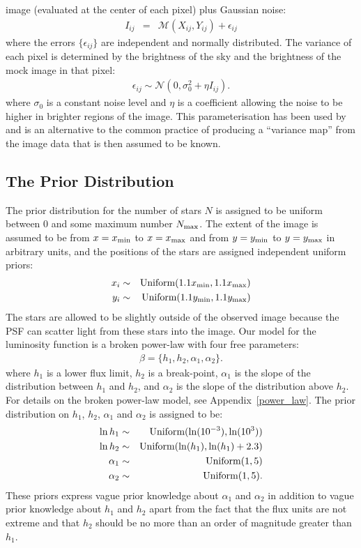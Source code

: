 \documentclass[manuscript]{aastex}
\begin{document}
image (evaluated at the center of each pixel) plus Gaussian noise:
\begin{eqnarray}
I_{ij} &=& \mathcal{M}(X_{ij}, Y_{ij}) + \epsilon_{ij}
\end{eqnarray}
where the errors $\{\epsilon_{ij}\}$ are independent and normally distributed.
The variance of each pixel is determined by the brightness of the sky and the
brightness of the mock image in that pixel:
\begin{eqnarray}
\epsilon_{ij} \sim \mathcal{N}(0, \sigma_0^2 + \eta I_{ij}).
\end{eqnarray}
where $\sigma_0$ is a constant noise level and $\eta$ is a coefficient allowing
the noise to be higher in brighter regions of the image.
This parameterisation has been used by \citet{2011MNRAS.412.2521B} and is an
alternative to the common practice of producing a ``variance map'' from the
image data that is then assumed to be known.

\subsection{The Prior Distribution}
The prior distribution for the number of stars $N$ is assigned to be uniform
between 0 and some maximum number $N_{\rm max}$. The extent of the image is
assumed to be from $x=x_{\rm min}$ to $x=x_{\rm max}$ and from
$y=y_{\rm min}$ to $y=y_{\rm max}$ in arbitrary units, and the
positions of the stars are assigned independent uniform priors:
\begin{eqnarray}
x_i &\sim& \textnormal{Uniform}(1.1 x_{\rm min}, 1.1 x_{\rm max}) \\
y_i &\sim& \textnormal{Uniform}(1.1 y_{\rm min}, 1.1 y_{\rm max})
\end{eqnarray}
The stars are allowed to be slightly outside of the observed image because the
PSF can scatter light from these stars into the image. Our model for the
luminosity function is a broken power-law with four
free parameters:
\begin{eqnarray}
\beta = \{h_1, h_2, \alpha_1, \alpha_2\}.
\end{eqnarray}
where $h_1$ is a lower flux limit, $h_2$ is a break-point, $\alpha_1$ is
the slope of the distribution between $h_1$ and $h_2$, and $\alpha_2$ is the
slope of the distribution above $h_2$. For details on the broken power-law
model, see Appendix~\ref{power_law}. The prior distribution on $h_1$, $h_2$,
$\alpha_1$ and $\alpha_2$ is assigned to be:
\begin{eqnarray}
\ln h_1 &\sim& \textnormal{Uniform}(\ln(10^{-3}), \ln(10^3)) \\
\ln h_2 &\sim& \textnormal{Uniform}(\ln(h_1), \ln(h_1) + 2.3) \\
\alpha_1 &\sim& \textnormal{Uniform}(1, 5) \\
\alpha_2 &\sim& \textnormal{Uniform}(1, 5).
\end{eqnarray}
These priors express vague prior knowledge about $\alpha_1$ and $\alpha_2$ in
addition to vague prior knowledge about $h_1$ and $h_2$ apart from the fact
that the flux units are not extreme and that $h_2$ should be no more than an
order of magnitude greater than $h_1$.
\end{document}
